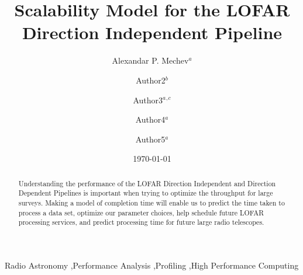 \documentclass[preprint,5p]{elsarticle}
\begin{document}
\sloppy

\begin{frontmatter}


\title{Scalability Model for the LOFAR Direction Independent Pipeline}%
\author{Alexandar P. Mechev$^a$}

\author{Author2$^b$}%
\author{Author3$^a$$^,$$^c$}%
\author{Author4$^a$}%
\author{Author5$^a$}%

\date{\today}%
\address{$^a$Leiden University}
\address{$^b$Affiliation Address 2}
\address{$^c$Affiliation Address 3}

\begin{abstract}
Understanding the performance of the LOFAR Direction Independent and Direction Dependent Pipelines is important when trying to optimize the throughput for large surveys. Making a model of completion time will enable us to predict the time taken to process a data set, optimize our parameter choices,  help schedule future LOFAR processing services, and predict processing time for future large radio telescopes. 

\end{abstract}
\begin{keyword}
Radio Astronomy \sep Performance Analysis \sep Profiling \sep High Performance Computing


\end{keyword}
\end{frontmatter}

%
\end{document}
